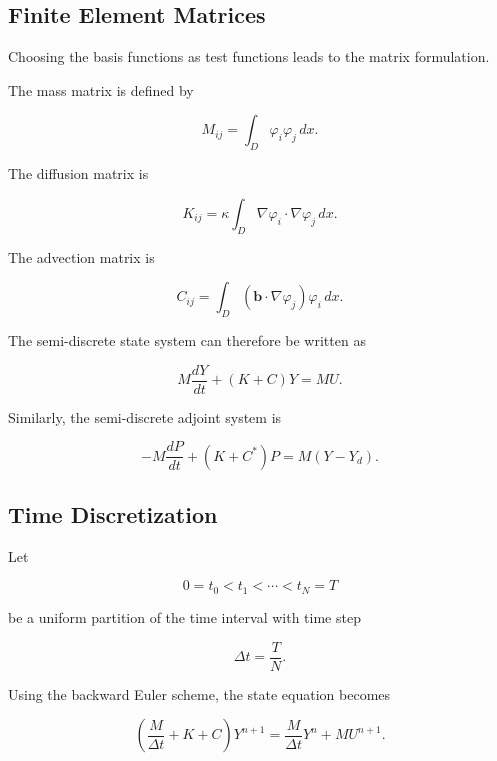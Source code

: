 \subsection{Finite Element Matrices}

Choosing the basis functions as test functions leads to the matrix formulation.

The mass matrix is defined by

\begin{equation}
M_{ij}
=
\int_D
\varphi_i \varphi_j
\,dx.
\label{eq:mass_matrix}
\end{equation}

The diffusion matrix is

\begin{equation}
K_{ij}
=
\kappa
\int_D
\nabla\varphi_i\cdot\nabla\varphi_j
\,dx.
\label{eq:stiffness_matrix}
\end{equation}

The advection matrix is

\begin{equation}
C_{ij}
=
\int_D
(\mathbf b\cdot\nabla\varphi_j)
\varphi_i
\,dx.
\label{eq:advection_matrix}
\end{equation}

The semi-discrete state system can therefore be written as

\begin{equation}
M\frac{dY}{dt}
+
(K+C)Y
=
MU.
\label{eq:semi_discrete_state}
\end{equation}

Similarly, the semi-discrete adjoint system is

\begin{equation}
-M\frac{dP}{dt}
+
(K+C^\ast)P
=
M(Y-Y_d).
\label{eq:semi_discrete_adjoint}
\end{equation}

\subsection{Time Discretization}

Let

\[
0=t_0<t_1<\cdots<t_N=T
\]

be a uniform partition of the time interval with time step

\[
\Delta t
=
\frac{T}{N}.
\]

Using the backward Euler scheme, the state equation becomes

\begin{equation}
\left(
\frac{M}{\Delta t}
+
K+C
\right)
Y^{n+1}
=
\frac{M}{\Delta t}Y^n
+
MU^{n+1}.
\label{eq:euler_state}
\end{equation}

